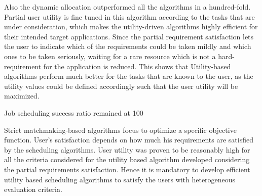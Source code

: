 \documentclass[times, 10pt,twocolumn]{article}
\begin{document}
Also the dynamic allocation outperformed all the algorithms in a hundred-fold. Partial user utility is fine tuned in this algorithm according to the tasks that are under consideration, which makes the utility-driven algorithms highly efficient for their intended target applications. Since the partial requirement satisfaction lets the user to indicate which of the requirements could be taken mildly and which ones to be taken seriously, waiting for a rare resource which is not a hard-requirement for the application is reduced. This shows that Utility-based algorithms perform much better for the tasks that are known to the user, as the utility values could be defined accordingly such that the user utility will be maximized. 

Job scheduling success ratio remained at 100%

Strict matchmaking-based algorithms focus to optimize a specific objective function. User's satisfaction depends on how much his requirements are satisfied by the scheduling algorithms. User utility was proven to be reasonably high for all the criteria considered for the utility based algorithm developed considering the partial requirements satisfaction. Hence it is mandatory to develop efficient utility based scheduling algorithms to satisfy the users with heterogeneous evaluation criteria.
\end{document}
